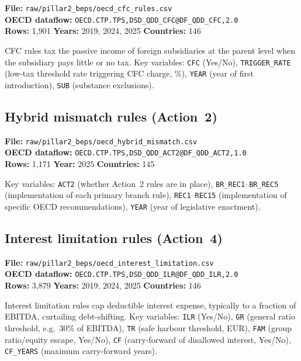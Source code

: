 \documentclass[11pt,a4paper]{article}
\newcommand{\code}[1]{\texttt{#1}}
\begin{document}
\textbf{File:} \texttt{raw/pillar2\_beps/oecd\_cfc\_rules.csv}\\
\textbf{OECD dataflow:} \texttt{OECD.CTP.TPS,DSD\_QDD\_CFC@DF\_QDD\_CFC,2.0}\\
\textbf{Rows:} 1{,}901 \quad \textbf{Years:} 2019, 2024, 2025 \quad \textbf{Countries:} 146

CFC rules tax the passive income of foreign subsidiaries at the parent level when the subsidiary pays little or no tax.  Key variables: \code{CFC} (Yes/No), \code{TRIGGER\_RATE} (low-tax threshold rate triggering CFC charge, \%), \code{YEAR} (year of first introduction), \code{SUB} (substance exclusions).

\subsection{Hybrid mismatch rules (Action~2)}

\textbf{File:} \texttt{raw/pillar2\_beps/oecd\_hybrid\_mismatch.csv}\\
\textbf{OECD dataflow:} \texttt{OECD.CTP.TPS,DSD\_QDD\_ACT2@DF\_QDD\_ACT2,1.0}\\
\textbf{Rows:} 1{,}171 \quad \textbf{Year:} 2025 \quad \textbf{Countries:} 145

Key variables: \code{ACT2} (whether Action~2 rules are in place), \code{BR\_REC1}--\code{BR\_REC5} (implementation of each primary branch rule), \code{REC1}--\code{REC15} (implementation of specific OECD recommendations), \code{YEAR} (year of legislative enactment).

\subsection{Interest limitation rules (Action~4)}

\textbf{File:} \texttt{raw/pillar2\_beps/oecd\_interest\_limitation.csv}\\
\textbf{OECD dataflow:} \texttt{OECD.CTP.TPS,DSD\_QDD\_ILR@DF\_QDD\_ILR,2.0}\\
\textbf{Rows:} 3{,}879 \quad \textbf{Years:} 2019, 2024, 2025 \quad \textbf{Countries:} 146

Interest limitation rules cap deductible interest expense, typically to a fraction of EBITDA, curtailing debt-shifting.  Key variables: \code{ILR} (Yes/No), \code{GR} (general ratio threshold, e.g.\ 30\% of EBITDA), \code{TR} (safe harbour threshold, EUR), \code{FAM} (group ratio/equity escape, Yes/No), \code{CF} (carry-forward of disallowed interest, Yes/No), \code{CF\_YEARS} (maximum carry-forward years).
\end{document}
